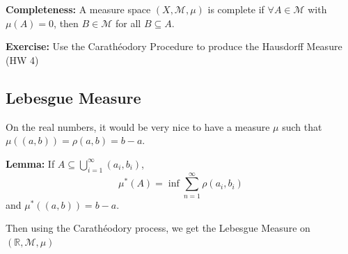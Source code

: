 \documentclass[12pt]{report}
\newcommand{\R}{\mathbb{R}}
\newcommand{\M}{\mathcal{M}}
\newcommand{\sub}{\subseteq}
\newenvironment*{exercise}[1][red]{
    \begin{tcolorbox}[
        parbox=false,
        colback=#1!5!white,
        colframe=#1!75!black,
        breakable
    ]}
    {\end{tcolorbox}}
\begin{document}
    \textbf{Completeness:} A measure space $(X, \M, \mu)$ is complete if $\forall A \in \M$ with $\mu(A) = 0$, then $B \in \M$ for all $B \sub A$.

    \begin{exercise}
        \textbf{Exercise:} Use the Carathéodory Procedure to produce the Hausdorff Measure (HW 4)
    \end{exercise}

\subsection*{Lebesgue Measure} 
    On the real numbers, it would be very nice to have a measure $\mu$ such that $\mu((a, b)) = \rho(a, b) = b - a$.
    
    \textbf{Lemma:} If $A \sub \bigcup_{i=1}^\infty (a_i, b_i)$,
    \[\mu^*(A) = \inf \sum_{n=1}^{\infty} \rho(a_i, b_i)\] 
    and $\mu^*((a, b)) = b - a$. 
   
    Then using the Carathéodory process, we get the Lebesgue Measure on $(\R, \M, \mu)$
\end{document}
